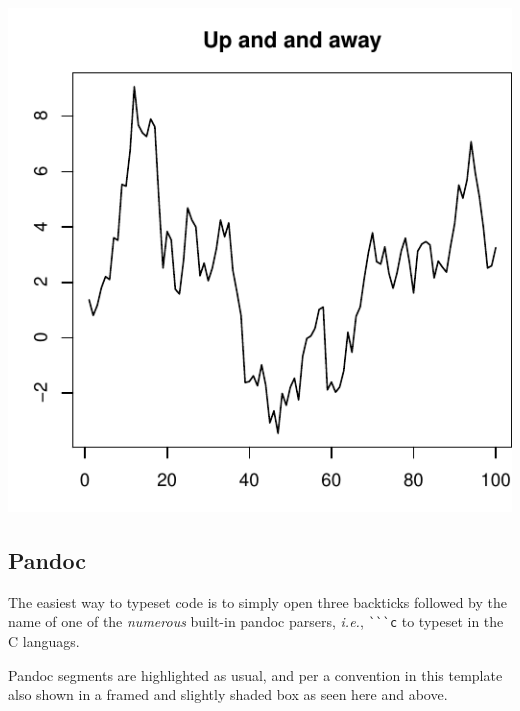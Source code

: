 \documentclass[letterpaper,9pt,twocolumn,twoside,]{pinp}
\begin{document}
\begin{center}\includegraphics{pinp_files/figure-latex/unnamed-chunk-2-1} \end{center}

\hypertarget{pandoc}{%
\subsection{Pandoc}\label{pandoc}}

The easiest way to typeset code is to simply open three backticks
followed by the name of one of the \emph{numerous} built-in pandoc
parsers, \emph{i.e.}, \verb|```c| to typeset in the C languags.

\begin{Shaded}
\begin{Highlighting}[]
\OperatorTok{(}\OperatorTok{)} \OperatorTok{\{}
    \OperatorTok{+}\OperatorTok{;}          
\OperatorTok{\}}
\end{Highlighting}
\end{Shaded}

Pandoc segments are highlighted as usual, and per a convention in this
template also shown in a framed and slightly shaded box as seen here and
above.
\end{document}

